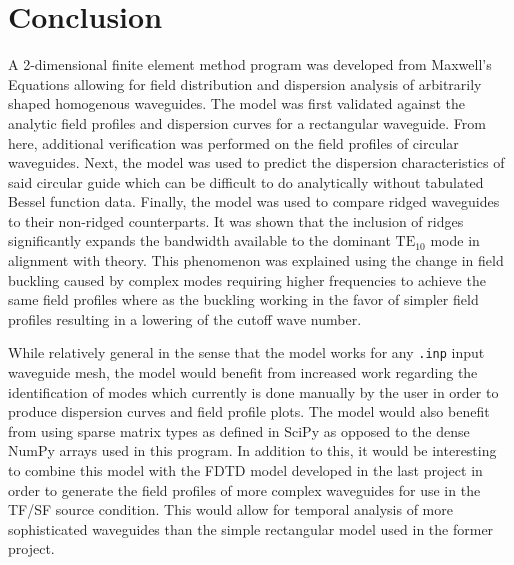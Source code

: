 \section{Conclusion}
\label{sec:conclusion}
A 2-dimensional finite element method program was developed from Maxwell's Equations allowing for field distribution and dispersion analysis of arbitrarily shaped homogenous waveguides. The model was first validated against the analytic field profiles and dispersion curves for a rectangular waveguide. From here, additional verification was performed on the field profiles of circular waveguides. Next, the model was used to predict the dispersion characteristics of said circular guide which can be difficult to do analytically without tabulated Bessel function data. Finally, the model was used to compare ridged waveguides to their non-ridged counterparts. It was shown that the inclusion of ridges significantly expands the bandwidth available to the dominant $\mathrm{TE}_{10}$ mode in alignment with theory. This phenomenon was explained using the change in field buckling caused by complex modes requiring higher frequencies to achieve the same field profiles where as the buckling working in the favor of simpler field profiles resulting in a lowering of the cutoff wave number.

While relatively general in the sense that the model works for any \verb|.inp| input waveguide mesh, the model would benefit from increased work regarding the identification of modes which currently is done manually by the user in order to produce dispersion curves and field profile plots. The model would also benefit from using sparse matrix types as defined in SciPy as opposed to the dense NumPy arrays used in this program. In addition to this, it would be interesting to combine this model with the FDTD model developed in the last project in order to generate the field profiles of more complex waveguides for use in the TF/SF source condition. This would allow for temporal analysis of more sophisticated waveguides than the simple rectangular model used in the former project. 